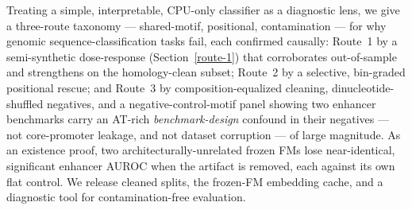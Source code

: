 \documentclass{ws-procs11x85}
\begin{document}
Treating a simple, interpretable, CPU-only classifier as a diagnostic lens, we give a three-route
taxonomy --- shared-motif, positional, contamination --- for why genomic sequence-classification tasks
fail, each confirmed causally: Route~1 by a semi-synthetic dose-response (Section~\ref{route-1}) that
corroborates out-of-sample and strengthens on the homology-clean subset; Route~2 by a selective, bin-graded positional
rescue; and Route~3 by composition-equalized cleaning, dinucleotide-shuffled negatives, and a
negative-control-motif panel showing two enhancer benchmarks carry an AT-rich \emph{benchmark-design}
confound in their negatives --- not core-promoter leakage, and not dataset corruption --- of large
magnitude. As an existence proof, two architecturally-unrelated frozen FMs lose near-identical,
significant enhancer AUROC when the artifact is removed, each against its own flat control. We release
cleaned splits, the frozen-FM embedding cache, and a
diagnostic tool for contamination-free evaluation.
\end{document}
